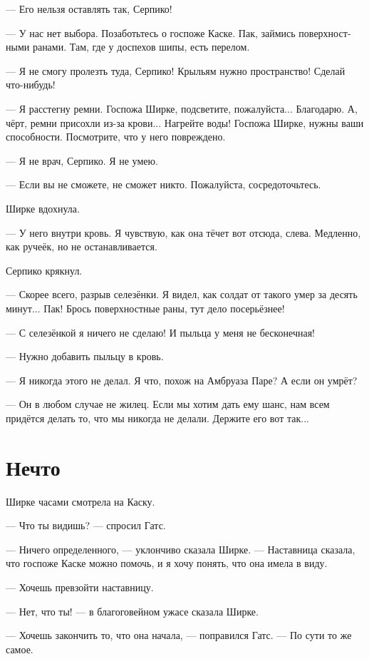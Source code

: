 \documentclass[a4paper,12pt,fleqn]{book}\usepackage{polyglossia}\setdefaultlanguage[babelshorthands=true]{russian}\setotherlanguage{english}\defaultfontfeatures{Ligatures=TeX,Mapping=tex-text}\usepackage{xcolor}\newcommand{\ml}[3]{#2}
\begin{document}
--- Его нельзя оставлять так, Серпико!

--- У нас нет выбора.
Позаботьтесь о госпоже Каске.
Пак, займись поверхностными ранами.
Там, где у доспехов шипы, есть перелом.

--- Я не смогу пролезть туда, Серпико!
Крыльям нужно пространство!
Сделай что-нибудь!

--- Я расстегну ремни.
Госпожа Ширке, подсветите, пожалуйста...
Благодарю.
А, чёрт, ремни присохли из-за крови...
Нагрейте воды!
Госпожа Ширке, нужны ваши способности.
Посмотрите, что у него повреждено.

--- Я не врач, Серпико.
Я не умею.

--- Если вы не сможете, не сможет никто.
Пожалуйста, сосредоточьтесь.

Ширке вдохнула.

--- У него внутри кровь.
Я чувствую, как она тёчет вот отсюда, слева.
Медленно, как ручеёк, но не останавливается.

Серпико крякнул.

--- Скорее всего, разрыв селезёнки.
Я видел, как солдат от такого умер за десять минут...
Пак!
Брось поверхностные раны, тут дело посерьёзнее!

--- С селезёнкой я ничего не сделаю!
И пыльца у меня не бесконечная!

--- Нужно добавить пыльцу в кровь.

--- Я никогда этого не делал.
Я что, похож на Амбруаза Паре?
А если он умрёт?

--- Он в любом случае не жилец.
Если мы хотим дать ему шанс, нам всем придётся делать то, что мы никогда не делали.
Держите его вот так...

\section{Нечто}

Ширке часами смотрела на Каску.

--- Что ты видишь? --- спросил Гатс.

--- Ничего определенного, --- уклончиво сказала Ширке.
--- Наставница сказала, что госпоже Каске можно помочь, и я хочу понять, что она имела в виду.

--- Хочешь превзойти наставницу.

--- Нет, что ты! --- в благоговейном ужасе сказала Ширке.

--- Хочешь закончить то, что она начала, --- поправился Гатс.
--- По сути то же самое.
\end{document}
